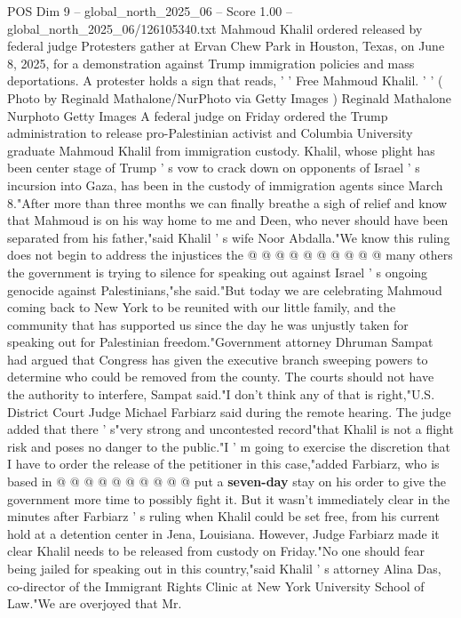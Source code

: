 \begin{textsample}{POS Dim 9 – global\_north\_2025\_06 – Score 1.00 – global\_north\_2025\_06/126105340.txt}  \label{ex:f9_pos_375}
Mahmoud Khalil ordered released by federal judge Protesters gather at Ervan Chew Park in Houston, Texas, on June 8, 2025, for a demonstration against Trump immigration policies and mass deportations.
A protester holds a sign that reads, ' ' Free Mahmoud Khalil. ' ' ( Photo by Reginald Mathalone/NurPhoto via Getty Images ) Reginald Mathalone Nurphoto Getty Images A federal judge on Friday ordered the Trump administration to release pro-Palestinian activist and Columbia University graduate Mahmoud Khalil from immigration custody.
Khalil, whose plight has been center stage of Trump ' s vow to crack down on opponents of Israel ' s incursion into Gaza, has been in the custody of immigration agents since March 8."After more than three months we can finally breathe a sigh of relief and know that Mahmoud is on his way home to me and Deen, who never should have been separated from his father,"said Khalil ' s wife Noor Abdalla."We know this ruling does not begin to address the injustices the @ @ @ @ @ @ @ @ @ @ many others the government is trying to silence for speaking out against Israel ' s ongoing genocide against Palestinians,"she said."But today we are celebrating Mahmoud coming back to New York to be reunited with our little family, and the community that has supported us since the day he was unjustly taken for speaking out for Palestinian freedom."Government attorney Dhruman Sampat had argued that Congress has given the executive branch sweeping powers to determine who could be removed from the county.
The courts should not have the authority to interfere, Sampat said."I don't think any of that is right,"U.S.
District Court Judge Michael Farbiarz said during the remote hearing.
The judge added that there ' s"very strong and uncontested record"that Khalil is not a flight risk and poses no danger to the public."I ' m going to exercise the discretion that I have to order the release of the petitioner in this case,"added Farbiarz, who is based in @ @ @ @ @ @ @ @ @ @ put a \textbf{seven-day} stay on his order to give the government more time to possibly fight it.
But it wasn't immediately clear in the minutes after Farbiarz ' s ruling when Khalil could be set free, from his current hold at a detention center in Jena, Louisiana.
However, Judge Farbiarz made it clear Khalil needs to be released from custody on Friday."No one should fear being jailed for speaking out in this country,"said Khalil ' s attorney Alina Das, co-director of the Immigrant Rights Clinic at New York University School of Law."We are overjoyed that Mr.

\end{textsample}
